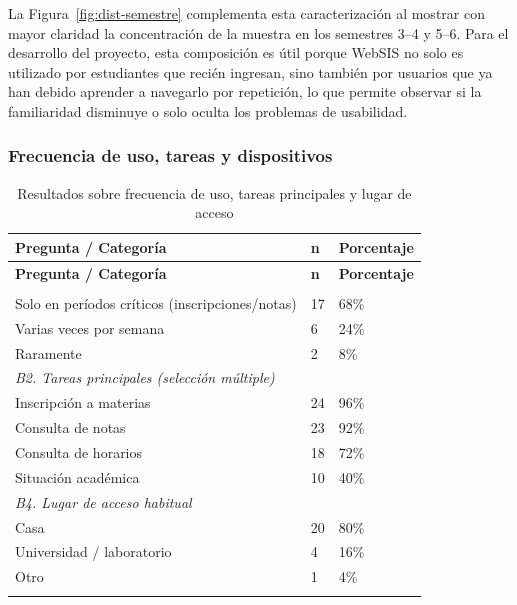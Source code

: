La Figura~\ref{fig:dist-semestre} complementa esta caracterización al mostrar con mayor claridad la concentración de la muestra en los semestres 3--4 y 5--6. Para el desarrollo del proyecto, esta composición es útil porque WebSIS no solo es utilizado por estudiantes que recién ingresan, sino también por usuarios que ya han debido aprender a navegarlo por repetición, lo que permite observar si la familiaridad disminuye o solo oculta los problemas de usabilidad.
 
\subsubsection{Frecuencia de uso, tareas y dispositivos}
 
\begin{longtable}{|p{9.5cm}|p{2cm}|p{2.5cm}|}
\hline
\textbf{Pregunta / Categoría} & \textbf{n} & \textbf{Porcentaje} \\
\hline
\endfirsthead
\hline
\textbf{Pregunta / Categoría} & \textbf{n} & \textbf{Porcentaje} \\
\hline
\endhead
\hline
\endfoot
\endlastfoot
 
\multicolumn{3}{|l|}{\textit{B1. Frecuencia de uso}} \\
\hline
Solo en períodos críticos (inscripciones/notas) & 17 & 68\% \\
Varias veces por semana                          & 6  & 24\% \\
Raramente                                        & 2  & 8\%  \\
\hline
\multicolumn{3}{|l|}{\textit{B2. Tareas principales (selección múltiple)}} \\
\hline
Inscripción a materias  & 24 & 96\% \\
Consulta de notas       & 23 & 92\% \\
Consulta de horarios    & 18 & 72\% \\
Situación académica     & 10 & 40\% \\
\hline
\multicolumn{3}{|l|}{\textit{B4. Lugar de acceso habitual}} \\
\hline
Casa                         & 20 & 80\% \\
Universidad / laboratorio    & 4  & 16\% \\
Otro                         & 1  & 4\%  \\
\hline
\caption{Resultados sobre frecuencia de uso, tareas principales y lugar de acceso}\label{tab:frecuencia-uso}
\end{longtable}

